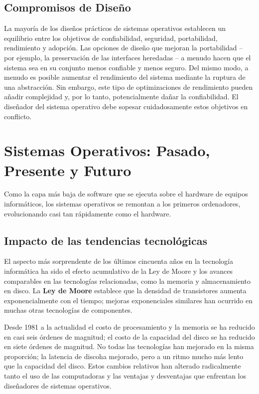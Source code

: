 \documentclass[10pt]{book}
\begin{document}
\subsection{Compromisos de Diseño}
La mayoría de los diseños prácticos de sistemas operativos establecen un equilibrio entre los objetivos de confiabilidad, seguridad, portabilidad, rendimiento y adopción. Las opciones de diseño que mejoran la portabilidad -- por ejemplo, la preservación de las interfaces heredadas -- a menudo hacen que el sistema sea en su conjunto menos confiable y menos seguro. Del mismo modo, a menudo es posible aumentar el rendimiento del sistema mediante la ruptura de una abstracción. Sin embargo, este tipo de optimizaciones de rendimiento pueden añadir complejidad y, por lo tanto, potencialmente dañar la confiabilidad. El diseñador del sistema operativo debe sopesar cuidadosamente estos objetivos en conflicto.


\section{Sistemas Operativos: Pasado, Presente y Futuro}
Como la capa más baja de software que se ejecuta sobre el hardware de equipos informáticos, los sistemas operativos se remontan a los primeros ordenadores, evolucionando casi tan rápidamente como el hardware.

\subsection{Impacto de las tendencias tecnológicas}
El aspecto más sorprendente de los últimos cincuenta años en la tecnología informática ha sido el efecto acumulativo de la Ley de Moore y los avances comparables en las tecnologías relacionadas, como la memoria y almacenamiento en disco. La \textbf{Ley de Moore} establece que la densidad de transistores aumenta exponencialmente con el tiempo; mejoras exponenciales similares han ocurrido en muchas otras tecnologías de componentes.

Desde 1981 a la actualidad el costo de procesamiento y la memoria se ha reducido en casi seis órdenes de magnitud; el costo de la capacidad del disco se ha reducido en siete órdenes de magnitud. No todas las tecnologías han mejorado en la misma proporción; la latencia de discoha mejorado, pero a un ritmo mucho más lento que la capacidad del disco. Estos cambios relativos han alterado radicalmente tanto el uso de las computadoras y las ventajas y desventajas que enfrentan los diseñadores de sistemas operativos.
\end{document}

